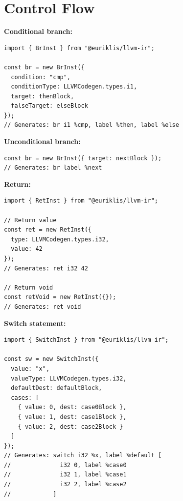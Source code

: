 \section{Control Flow}

\textbf{Conditional branch:}
\begin{lstlisting}[style=ts]
import { BrInst } from "@euriklis/llvm-ir";

const br = new BrInst({
  condition: "cmp",
  conditionType: LLVMCodegen.types.i1,
  target: thenBlock,
  falseTarget: elseBlock
});
// Generates: br i1 %cmp, label %then, label %else
\end{lstlisting}

\textbf{Unconditional branch:}
\begin{lstlisting}[style=ts]
const br = new BrInst({ target: nextBlock });
// Generates: br label %next
\end{lstlisting}

\textbf{Return:}
\begin{lstlisting}[style=ts]
import { RetInst } from "@euriklis/llvm-ir";

// Return value
const ret = new RetInst({
  type: LLVMCodegen.types.i32,
  value: 42
});
// Generates: ret i32 42

// Return void
const retVoid = new RetInst({});
// Generates: ret void
\end{lstlisting}

\textbf{Switch statement:}
\begin{lstlisting}[style=ts]
import { SwitchInst } from "@euriklis/llvm-ir";

const sw = new SwitchInst({
  value: "x",
  valueType: LLVMCodegen.types.i32,
  defaultDest: defaultBlock,
  cases: [
    { value: 0, dest: case0Block },
    { value: 1, dest: case1Block },
    { value: 2, dest: case2Block }
  ]
});
// Generates: switch i32 %x, label %default [
//              i32 0, label %case0
//              i32 1, label %case1
//              i32 2, label %case2
//            ]
\end{lstlisting}

